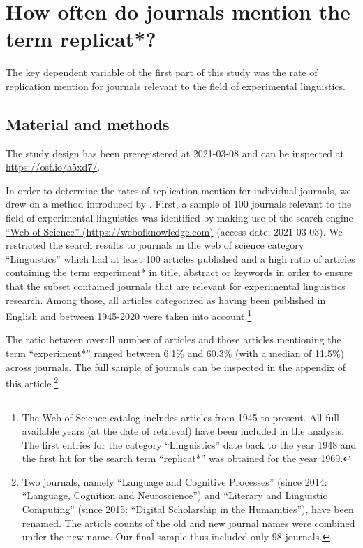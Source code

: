 \documentclass[cm,linguex]{glossa}
\begin{document}
\hypertarget{how-often-do-journals-mention-the-term-replicat}{%
\section{How often do journals mention the term replicat*?}\label{how-often-do-journals-mention-the-term-replicat}}

The key dependent variable of the first part of this study was the rate of replication mention for journals relevant to the field of experimental linguistics.

\hypertarget{material-and-methods}{%
\subsection{Material and methods}\label{material-and-methods}}

The study design has been preregistered at 2021-03-08 and can be inspected at \url{https://osf.io/a5xd7/}.

In order to determine the rates of replication mention for individual journals, we drew on a method introduced by \citet{makel_replications_2012}.
First, a sample of 100 journals relevant to the field of experimental linguistics was identified by making use of the search engine \href{https://webofknowledge.com}{``Web of Science'' (https://webofknowledge.com)} (access date: 2021-03-03). We restricted the search results to journals in the web of science category ``Linguistics'' which had at least 100 articles published and a high ratio of articles containing the term experiment* in title, abstract or keywords in order to ensure that the subset contained journals that are relevant for experimental linguistics research. Among those, all articles categorized as having been published in English and between 1945-2020 were taken into account.\footnote{The Web of Science catalog includes articles from 1945 to present. All full available years (at the date of retrieval) have been included in the analysis. The first entries for the category ``Linguistics'' date back to the year 1948 and the first hit for the search term ``replicat*'' was obtained for the year 1969.}

The ratio between overall number of articles and those articles mentioning the term ``experiment*'' ranged between 6.1\% and 60.3\% (with a median of 11.5\%) across journals.
The full sample of journals can be inspected in the appendix of this article.\footnote{Two journals, namely ``Language and Cognitive Processes'' (since 2014: ``Language, Cognition and Neuroscience'') and ``Literary and Linguistic Computing'' (since 2015: ``Digital Scholarship in the Humanities''), have been renamed. The article counts of the old and new journal names were combined under the new name. Our final sample thus included only 98 journals.}
\end{document}
